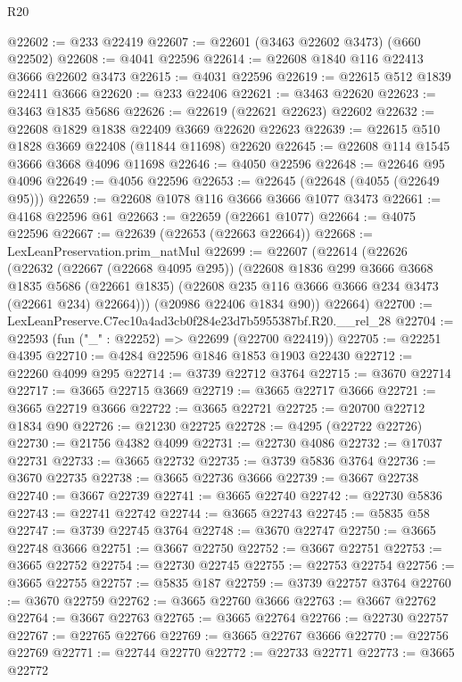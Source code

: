 \begin{lexlean}{R20}
\begin{coremodule}
@22602 := @233 @22419
@22607 := @22601 (@3463 @22602 @3473) (@660 @22502)
@22608 := @4041 @22596
@22614 := @22608 @1840 @116 @22413 @3666 @22602 @3473
@22615 := @4031 @22596
@22619 := @22615 @512 @1839 @22411 @3666
@22620 := @233 @22406
@22621 := @3463 @22620
@22623 := @3463 @1835 @5686
@22626 := @22619 (@22621 @22623) @22602
@22632 := @22608 @1829 @1838 @22409 @3669 @22620 @22623
@22639 := @22615 @510 @1828 @3669 @22408 (@11844 @11698) @22620
@22645 := @22608 @114 @1545 @3666 @3668 @4096 @11698
@22646 := @4050 @22596
@22648 := @22646 @95 @4096
@22649 := @4056 @22596
@22653 := @22645 (@22648 (@4055 (@22649 @95)))
@22659 := @22608 @1078 @116 @3666 @3666 @1077 @3473
@22661 := @4168 @22596 @61
@22663 := @22659 (@22661 @1077)
@22664 := @4075 @22596
@22667 := @22639 (@22653 (@22663 @22664))
@22668 := LexLeanPreservation.prim_natMul
@22699 := @22607
    (@22614
      (@22626
        (@22632
          (@22667 (@22668 @4095 @295))
          (@22608
            @1836
            @299
            @3666
            @3668
            @1835
            @5686
            (@22661 @1835)
            (@22608 @235 @116 @3666 @3666 @234 @3473 (@22661 @234) @22664)))
        (@20986 @22406 @1834 @90))
      @22664)
@22700 := LexLeanPreserve.C7ec10a4ad3cb0f284e23d7b5955387bf.R20.__rel_28
@22704 := @22593 (fun ("_" : @22252) => @22699 (@22700 @22419))
@22705 := @22251 @4395
@22710 := @4284 @22596 @1846 @1853 @1903 @22430
@22712 := @22260 @4099 @295
@22714 := @3739 @22712 @3764
@22715 := @3670 @22714
@22717 := @3665 @22715 @3669
@22719 := @3665 @22717 @3666
@22721 := @3665 @22719 @3666
@22722 := @3665 @22721
@22725 := @20700 @22712 @1834 @90
@22726 := @21230 @22725
@22728 := @4295 (@22722 @22726)
@22730 := @21756 @4382 @4099
@22731 := @22730 @4086
@22732 := @17037 @22731
@22733 := @3665 @22732
@22735 := @3739 @5836 @3764
@22736 := @3670 @22735
@22738 := @3665 @22736 @3666
@22739 := @3667 @22738
@22740 := @3667 @22739
@22741 := @3665 @22740
@22742 := @22730 @5836
@22743 := @22741 @22742
@22744 := @3665 @22743
@22745 := @5835 @58
@22747 := @3739 @22745 @3764
@22748 := @3670 @22747
@22750 := @3665 @22748 @3666
@22751 := @3667 @22750
@22752 := @3667 @22751
@22753 := @3665 @22752
@22754 := @22730 @22745
@22755 := @22753 @22754
@22756 := @3665 @22755
@22757 := @5835 @187
@22759 := @3739 @22757 @3764
@22760 := @3670 @22759
@22762 := @3665 @22760 @3666
@22763 := @3667 @22762
@22764 := @3667 @22763
@22765 := @3665 @22764
@22766 := @22730 @22757
@22767 := @22765 @22766
@22769 := @3665 @22767 @3666
@22770 := @22756 @22769
@22771 := @22744 @22770
@22772 := @22733 @22771
@22773 := @3665 @22772

\end{coremodule}
\end{lexlean}
